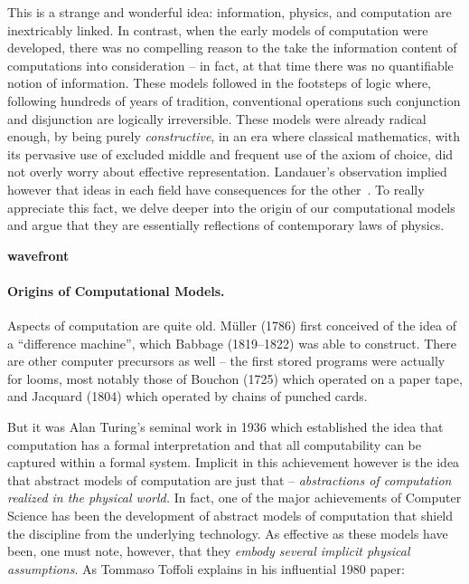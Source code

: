 \documentclass{article}
\newcommand{\amr}[1]{\fbox{Amr says:} \textbf{#1}}
\begin{document}
 
This is a strange and wonderful idea: information, physics, and
computation are inextricably linked. In contrast, when the early
models of computation were developed, there was no compelling reason
to the take the information content of computations into consideration
-- in fact, at that time there was no quantifiable notion of
information. These models followed in the footsteps of logic where,
following hundreds of years of tradition, conventional operations such
conjunction and disjunction are logically irreversible. These models
were already radical enough, by being purely \emph{constructive}, in
an era where classical mathematics, with its pervasive use of excluded
middle and frequent use of the axiom of choice, did not overly worry
about effective representation. Landauer's observation implied however
that ideas in each field have consequences for the
other~\cite{bennett:1973:lrc,bennett1985fundamental,bennett2010notes,bennett2003notes,baker:1992:nft,baez2011physics,dblp:conf/csfw/malacarias12}. To
really appreciate this fact, we delve deeper into the origin of our
computational models and argue that they are essentially reflections
of contemporary laws of physics. 

\amr{wavefront}

\paragraph*{Origins of Computational Models.}
Aspects of computation are
quite old. M\"{u}ller (1786) first conceived of the idea of a
``difference machine'', which Babbage (1819--1822) was able to
construct. There are other computer precursors as well -- the first
stored programs were actually for looms, most notably those of
Bouchon (1725) which operated on a paper tape, and Jacquard (1804)
which operated by chains of punched cards.

But it was Alan Turing's seminal work in 1936 which established the idea
that computation has a formal interpretation and that all
computability can be captured within a formal system. Implicit in this
achievement however is the idea that abstract models of computation
are just that -- \emph{abstractions of computation realized in the
physical world.}  In fact, one of the major achievements of Computer
Science has been the development of abstract models of computation
that shield the discipline from the underlying technology. As
effective as these models have been, one must note, however, that they
\emph{embody several implicit physical assumptions}.  As Tommaso
Toffoli explains in his influential 1980 paper:
\end{document}
